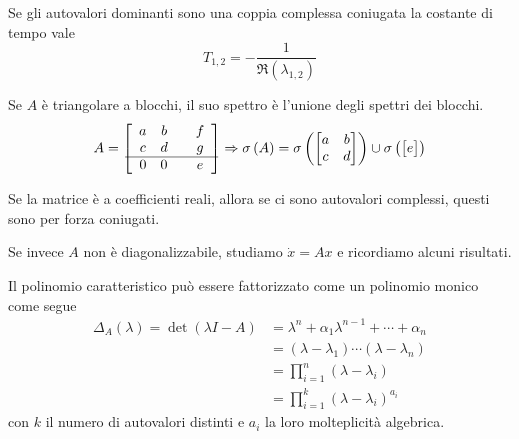 \documentclass[10pt,a4paper]{book}
\begin{document}
Se gli autovalori dominanti sono una coppia complessa coniugata la costante di tempo vale
\begin{equation*}
	\boxed{T_{1,2} =-\frac{1}{\Re\left(\lambda _{1,2}\right)}}
\end{equation*}
\begin{ricalg}
	Se $A$ è triangolare a blocchi, il suo spettro è l'unione degli spettri dei blocchi.
	\begin{equation*}
		A=\begin{bmatrix}
		\begin{array}{ c c }
			a & b \\
			c & d 
		\end{array} & \begin{array}{ c }
		f\\
		g
		\end{array}\\
		\hline
		\begin{array}{ c c }
			0 & 0 
		\end{array} & e
		\end{bmatrix} \Rightarrow \sigma \left(A\right) =\sigma \left(\begin{bmatrix}
		a & b\\
		c & d
		\end{bmatrix}\right) \cup \sigma \left(\begin{bmatrix}
		e
		\end{bmatrix}\right)
	\end{equation*}
\end{ricalg}
\begin{ricalg}
	Se la matrice è a coefficienti reali, allora se ci sono autovalori complessi, questi sono per forza coniugati.
\end{ricalg}
Se invece $A$ non è diagonalizzabile, studiamo $\dot{x} =Ax$ e ricordiamo alcuni risultati.
\begin{ricalg}
	Il polinomio caratteristico può essere fattorizzato come un polinomio monico come segue\begin{equation*}
	\begin{aligned}
		\Delta _A\left(\lambda \right) =\det\left(\lambda I-A\right) & =\lambda ^n +\alpha _1 \lambda ^{n-1} +\cdots +\alpha _n                    \\
		                                                                       & =\left(\lambda -\lambda _1\right) \cdots \left(\lambda -\lambda _n\right) \\
		                                                                       & =\prod^n_{i=1}\left(\lambda -\lambda _i\right)                   \\
		                                                                       & =\prod^k_{i=1}\left(\lambda -\lambda _i\right)^{a_i}             
	\end{aligned}
	\end{equation*}
	con $k$ il numero di autovalori distinti e $a_i$ la loro molteplicità algebrica.
\end{ricalg}
\end{document}
